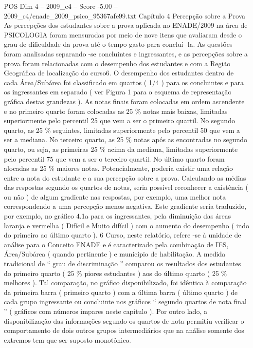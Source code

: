 \begin{textsample}{POS Dim 4 – 2009\_c4 – Score -5.00 – 2009\_c4/enade\_2009\_psico\_95367afe99.txt}  \label{ex:f4_pos_330}
Capítulo 4 Percepção sobre a Prova As percepções dos estudantes sobre a prova aplicada no ENADE/2009 na área de PSICOLOGIA foram mensuradas por meio de nove itens que avaliaram desde o grau de dificuldade da prova até o tempo gasto para concluí -la.
As questões foram analisadas separando -se concluintes e ingressantes, e as percepções sobre a prova foram relacionadas com o desempenho dos estudantes e com a Região Geográfica de localização do curso6.
O desempenho dos estudantes dentro de cada Área/Subárea foi classificado em quartos ( 1/4 ) para os concluintes e para os ingressantes em separado ( ver Figura 1 para o esquema de representação gráfica destas grandezas ).
As notas finais foram colocadas em ordem ascendente e no primeiro quarto foram colocadas as 25 \% notas mais baixas, limitadas superiormente pelo percentil 25 que vem a ser o primeiro quartil.
No segundo quarto, as 25 \% seguintes, limitadas superiormente pelo percentil 50 que vem a ser a mediana.
No terceiro quarto, as 25 \% notas após as encontradas no segundo quarto, ou seja, as primeiras 25 \% acima da mediana, limitadas superiormente pelo percentil 75 que vem a ser o terceiro quartil.
No último quarto foram alocadas as 25 \% maiores notas.
Potencialmente, poderia existir uma relação entre a nota do estudante e a sua percepção sobre a prova.
Calculando as médias das respostas segundo os quartos de notas, seria possível reconhecer a existência ( ou não ) de algum gradiente nas respostas, por exemplo, uma melhor nota correspondendo a uma percepção menos negativa.
Este gradiente seria traduzido, por exemplo, no gráfico 4.1a para os ingressantes, pela diminuição das áreas laranja e vermelha ( Difícil e Muito difícil ) com o aumento do desempenho ( indo do primeiro ao último quarto ). 6 Curso, neste relatório, refere -se à unidade de análise para o Conceito ENADE e é caracterizado pela combinação de IES, Área/Subárea ( quando pertinente ) e município de habilitação.
A medida tradicional de “ grau de discriminação ” comparou os resultados dos estudantes do primeiro quarto ( 25 \% piores estudantes ) aos do último quarto ( 25 \% melhores ).
Tal comparação, no gráfico disponibilizado, foi idêntica à comparação da primeira barra ( primeiro quarto ) com a última barra ( último quarto ) de cada grupo ingressante ou concluinte nos gráficos “ segundo quartos de nota final ” ( gráficos com números ímpares neste capítulo ).
Por outro lado, a disponibilização das informações segundo os quartos de nota permitiu verificar o comportamento de dois outros grupos intermediários que na análise somente dos extremos tem que ser suposto monotônico.

\end{textsample}

